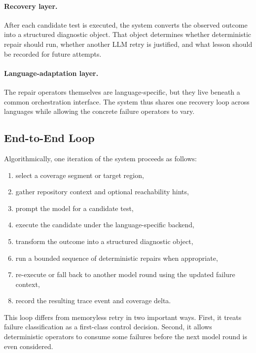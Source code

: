 \documentclass[10pt]{article}
\begin{document}
\paragraph{Recovery layer.}
After each candidate test is executed, the system converts the observed outcome into a structured diagnostic object. That object determines whether deterministic repair should run, whether another LLM retry is justified, and what lesson should be recorded for future attempts.

\paragraph{Language-adaptation layer.}
The repair operators themselves are language-specific, but they live beneath a common orchestration interface. The system thus shares one recovery loop across languages while allowing the concrete failure operators to vary.

\subsection{End-to-End Loop}

Algorithmically, one iteration of the system proceeds as follows:

\begin{enumerate}[leftmargin=1.4em]
    \item select a coverage segment or target region,
    \item gather repository context and optional reachability hints,
    \item prompt the model for a candidate test,
    \item execute the candidate under the language-specific backend,
    \item transform the outcome into a structured diagnostic object,
    \item run a bounded sequence of deterministic repairs when appropriate,
    \item re-execute or fall back to another model round using the updated failure context,
    \item record the resulting trace event and coverage delta.
\end{enumerate}

This loop differs from memoryless retry in two important ways. First, it treats failure classification as a first-class control decision. Second, it allows deterministic operators to consume some failures before the next model round is even considered.
\end{document}
